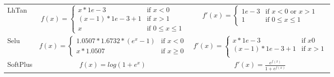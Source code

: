 \begin{table*}
\begin{adjustbox}{max width=\textwidth}
\begin{tabular}{lcc}
LhTan    &  $f(x) = \left\{\begin{array}{rl}
                            x * 1e-3           & \mbox{if }     x<0\\
                            (x - 1) * 1e-3 + 1 & \mbox{if }     x>1\\
                             x                 & \mbox{if } 0\leq x \leq 1
                           \end{array}\right.$                         
                                                    &  $f'(x) = \left\{\begin{array}{rl}
                                                                        1e-3           & \mbox{if }     x<0 \mbox{ or } x>1 \\
                                                                        1                 & \mbox{if } 0\leq x \leq 1
                                                                       \end{array}\right.$                                                                                            \\
  
Selu     &  $f(x) =\left\{\begin{array}{rl}
                            1.0507 * 1.6732 * (e^{x}-1) & \mbox{if }     x<0\\
                            x * 1.0507                  & \mbox{if }     x\geq0                  
                           \end{array}\right.$                             
                                                    
                                                    &  $f'(x) = \left\{\begin{array}{rl}
                                                                        x * 1e-3           & \mbox{if } x0\\
                                                                        (x - 1) * 1e-3 + 1 & \mbox{if } x>1\\
                                                                        \end{array}\right.$                                                                                           \\

SoftPlus &  $f(x) = log(1 + e^{x})$                 &  $f'(x) = \frac{e^{f(x)}}{1 + e^{f(x)}}$                                                                                            \\


\end{tabular}
\end{adjustbox}
\end{table*}
